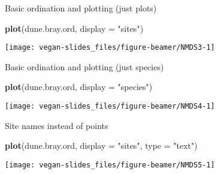 \documentclass[10pt,ignorenonframetext,compress, aspectratio=169]{beamer}
\newenvironment{Shaded}{\begin{snugshade}}{\end{snugshade}}
\newcommand{\KeywordTok}[1]{\textcolor[rgb]{0.13,0.29,0.53}{\textbf{{#1}}}}
\newcommand{\DataTypeTok}[1]{\textcolor[rgb]{0.13,0.29,0.53}{{#1}}}
\newcommand{\StringTok}[1]{\textcolor[rgb]{0.31,0.60,0.02}{{#1}}}
\newcommand{\NormalTok}[1]{{#1}}
\begin{document}
\begin{frame}[fragile]{Basic ordination and plotting (just plots)}

\begin{Shaded}
\begin{Highlighting}[]
\KeywordTok{plot}\NormalTok{(dune.bray.ord, }\DataTypeTok{display =} \StringTok{"sites"}\NormalTok{)}
\end{Highlighting}
\end{Shaded}

\begin{center}\texttt{[image: vegan-slides\_files/figure-beamer/NMDS3-1]} \end{center}

\end{frame}

\begin{frame}[fragile]{Basic ordination and plotting (just species)}

\begin{Shaded}
\begin{Highlighting}[]
\KeywordTok{plot}\NormalTok{(dune.bray.ord, }\DataTypeTok{display =} \StringTok{"species"}\NormalTok{)}
\end{Highlighting}
\end{Shaded}

\begin{center}\texttt{[image: vegan-slides\_files/figure-beamer/NMDS4-1]} \end{center}

\end{frame}

\begin{frame}[fragile]{Site names instead of points}

\begin{Shaded}
\begin{Highlighting}[]
\KeywordTok{plot}\NormalTok{(dune.bray.ord, }\DataTypeTok{display =} \StringTok{"sites"}\NormalTok{, }\DataTypeTok{type =} \StringTok{"text"}\NormalTok{)}
\end{Highlighting}
\end{Shaded}

\begin{center}\texttt{[image: vegan-slides\_files/figure-beamer/NMDS5-1]} \end{center}

\end{frame}
\end{document}
